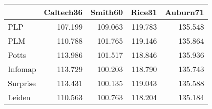 \begin{tabular}{lrrrr}
\toprule
{} & Caltech36 & Smith60 &  Rice31 & Auburn71 \\
\midrule
PLP      &   107.199 & 109.063 & 119.783 &  135.548 \\
PLM      &   110.788 & 101.765 & 119.146 &  135.864 \\
Potts    &   113.986 & 101.517 & 118.846 &  135.936 \\
Infomap  &   113.729 & 100.203 & 118.790 &  135.743 \\
Surprise &   113.431 & 100.135 & 119.043 &  135.588 \\
Leiden   &   110.563 & 100.763 & 118.204 &  135.184 \\
\bottomrule
\end{tabular}
